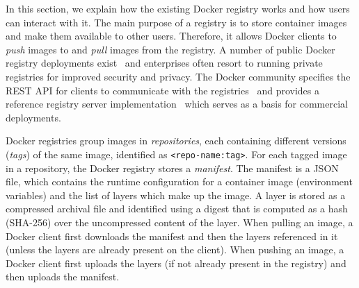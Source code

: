 \label{sec:background}


%
%

In this section, we explain how the existing Docker registry works and how users
can interact with it.
%
The main purpose of a registry is to store container images and make them available
to other users.
%
Therefore, it allows Docker clients to \emph{push} images to and \emph{pull}
images from the registry.
%
A number of public Docker registry deployments
exist~\cite{docker-hub,amazon-ecr,jfrog-artifactory,azure-cr,google-cr} and
enterprises often resort to running private registries for improved security
and privacy.
%
The Docker community specifies the REST API for clients to communicate with the
registries~\cite{docker-registry-api} and provides a reference registry server implementation~\cite{docker-registry-software} which serves as
a basis for commercial deployments.





Docker registries group images in \emph{repositories}, each containing
different versions (\emph{tags}) of the same image, identified as
\texttt{<repo-name:tag>}.
%
For each tagged image in a repository, the Docker registry stores a \emph{manifest}.
%
The manifest is a JSON file, which contains the runtime configuration for a
container image (\eg environment variables) and the list of layers which make
up the image.
%
A layer is stored as a compressed archival file and identified using a digest that is computed as a hash (SHA-256) over
the uncompressed content of the layer.
%
When pulling an image, a Docker client first downloads the manifest and then the
layers referenced in it (unless the layers are already present on the client).
%
When pushing an image, a Docker client first uploads the layers (if not already present in
the registry) and then uploads the manifest.





